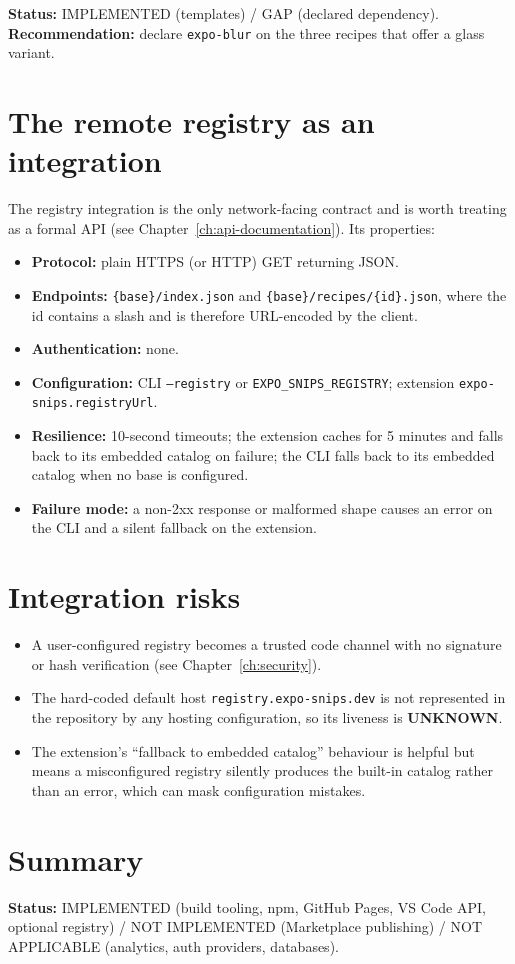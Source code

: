 \textbf{Status:} IMPLEMENTED (templates) / GAP (declared dependency).
\textbf{Recommendation:} declare \texttt{expo-blur} on the three recipes that
offer a glass variant.

\section{The remote registry as an integration}

The registry integration is the only network-facing contract and is worth
treating as a formal API (see Chapter~\ref{ch:api-documentation}). Its
properties:

\begin{itemize}
  \item \textbf{Protocol:} plain HTTPS (or HTTP) GET returning JSON.
  \item \textbf{Endpoints:} \texttt{\{base\}/index.json} and
        \texttt{\{base\}/recipes/\{id\}.json}, where the id contains a slash and
        is therefore URL-encoded by the client.
  \item \textbf{Authentication:} none.
  \item \textbf{Configuration:} CLI \texttt{--registry} or
        \texttt{EXPO\_SNIPS\_REGISTRY}; extension \texttt{expo-snips.registryUrl}.
  \item \textbf{Resilience:} 10-second timeouts; the extension caches for 5
        minutes and falls back to its embedded catalog on failure; the CLI falls
        back to its embedded catalog when no base is configured.
  \item \textbf{Failure mode:} a non-2xx response or malformed shape causes an
        error on the CLI and a silent fallback on the extension.
\end{itemize}

\section{Integration risks}

\begin{itemize}
  \item A user-configured registry becomes a trusted code channel with no
        signature or hash verification (see Chapter~\ref{ch:security}).
  \item The hard-coded default host \texttt{registry.expo-snips.dev} is not
        represented in the repository by any hosting configuration, so its
        liveness is \textbf{UNKNOWN}.
  \item The extension's ``fallback to embedded catalog'' behaviour is helpful but
        means a misconfigured registry silently produces the built-in catalog
        rather than an error, which can mask configuration mistakes.
\end{itemize}

\section{Summary}

\textbf{Status:} IMPLEMENTED (build tooling, npm, GitHub Pages, VS Code API,
optional registry) / NOT IMPLEMENTED (Marketplace publishing) / NOT APPLICABLE
(analytics, auth providers, databases).

